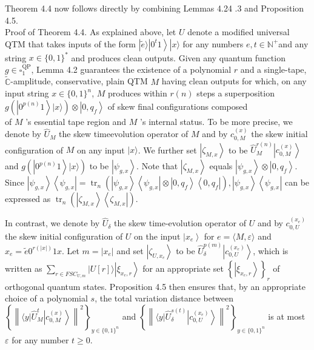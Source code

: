 \documentclass[10pt]{article}
\begin{document}
Theorem 4.4 now follows directly by combining Lemmas 4.24 .3 and Proposition 4.5.\\
Proof of Theorem 4.4. As explained above, let $U$ denote a modified universal QTM that takes inputs of the form $|\tilde{e}\rangle\left|0^{t} 1\right\rangle|x\rangle$ for any numbers $e, t \in \mathbb{N}^{+}$and any string $x \in\{0,1\}^{*}$ and produces clean outputs. Given any quantum function $g \in \square_{1}^{\mathrm{QP}}$, Lemma 4.2 guarantees the existence of a polynomial $r$ and a single-tape, $\tilde{\mathbb{C}}$-amplitude, conservative, plain QTM $M$ having clean outputs for which, on any input string $x \in\{0,1\}^{n}$, $M$ produces within $r(n)$ steps a superposition $g\left(\left|0^{p(n)} 1\right\rangle|x\rangle\right) \otimes\left|0, q_{f}\right\rangle$ of skew final configurations composed\\
of $M$ 's essential tape region and $M$ 's internal status. To be more precise, we denote by $\widehat{U}_{M}$ the skew timeevolution operator of $M$ and by $c_{0, M}^{(x)}$ the skew initial configuration of $M$ on any input $|x\rangle$. We further set $\left|\zeta_{M, x}\right\rangle$ to be $\widehat{U}_{M}^{r(n)}\left|c_{0, M}^{(x)}\right\rangle$ and $g\left(\left|0^{p(n)} 1\right\rangle|x\rangle\right)$ to be $\left|\psi_{g, x}\right\rangle$. Note that $\left|\zeta_{M, x}\right\rangle$ equals $\left|\psi_{g, x}\right\rangle \otimes\left|0, q_{f}\right\rangle$. Since $\left|\psi_{g, x}\right\rangle\left\langle\psi_{g, x}\right|=\operatorname{tr}_{n}\left(\left|\psi_{g, x}\right\rangle\left\langle\psi_{g, x}\right| \otimes\left|0, q_{f}\right\rangle\left\langle 0, q_{f}\right|\right),\left|\psi_{g, x}\right\rangle\left\langle\psi_{g, x}\right|$ can be expressed as $\operatorname{tr}_{n}\left(\left|\zeta_{M, x}\right\rangle\left\langle\zeta_{M, x}\right|\right)$.

In contrast, we denote by $\widehat{U}_{\delta}$ the skew time-evolution operator of $U$ and by $c_{0, U}^{\left(x_{e}\right)}$ the skew initial configuration of $U$ on the input $\left|x_{e}\right\rangle$ for $e=\langle M, \varepsilon\rangle$ and $x_{e}=\tilde{e} 0^{r(|x|)} 1 x$. Let $m=\left|x_{e}\right|$ and set $\left|\zeta_{U, x_{e}}\right\rangle$ to be $\widehat{U}_{\delta}^{p(m)}\left|c_{0, U}^{\left(x_{e}\right)}\right\rangle$, which is written as $\sum_{r \in F S C_{U, m}}|U[r]\rangle\left|\xi_{x_{e}, r}\right\rangle$ for an appropriate set $\left\{\left|\xi_{x_{e}, r}\right\rangle\right\}_{r}$ of orthogonal quantum states. Proposition 4.5 then ensures that, by an appropriate choice of a polynomial $s$, the total variation distance between $\left\{\left\|\langle y| \widehat{U}_{M}^{t}\left|c_{0, M}^{(x)}\right\rangle\right\|^{2}\right\}_{y \in\{0,1\}^{n}}$ and $\left\{\left\|\langle y| \widehat{U}_{\delta}^{s(t)}\left|c_{0, U}^{\left(x_{e}\right)}\right\rangle\right\|^{2}\right\}_{y \in\{0,1\}^{n}}$ is at most $\varepsilon$ for any number $t \geq 0$.
\end{document}
